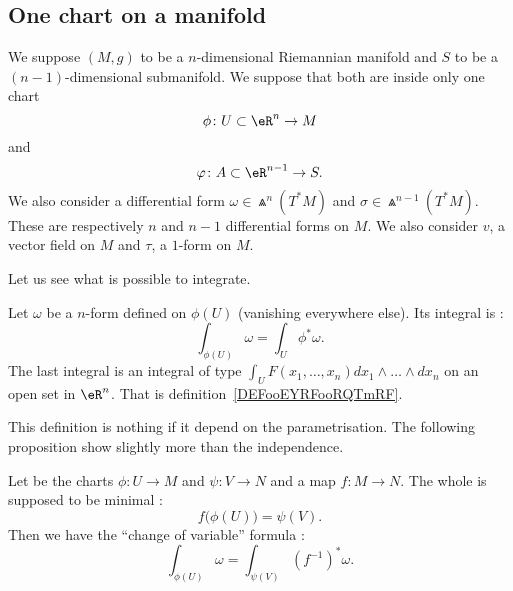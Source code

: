 \subsection{One chart on a manifold}

We suppose \( (M,g)\) to be a \( n\)-dimensional Riemannian manifold and \( S\) to be a \( (n-1)\)-dimensional submanifold. We suppose that both are inside only one chart
\begin{equation}
    \phi\colon U\subset \eR^n\to M
\end{equation}
and
\begin{equation}
    \varphi\colon A\subset \eR^{n-1}\to S.
\end{equation}
We also consider a differential form \( \omega\in \Wedge^n(T^*M)\) and \( \sigma\in\Wedge^{n-1}(T^*M)\). These are respectively \( n\) and \( n-1\) differential forms on \( M\).  We also consider \( v\), a vector field on \( M\) and \( \tau\), a \( 1\)-form on \(M\).

Let us see what is possible to integrate.

\begin{definition}       \label{DEFooPDRCooPiBklC}
    Let \( \omega\) be a \( n\)-form defined on \( \phi(U)\) (vanishing everywhere else). Its integral is :
    \begin{equation}
        \int_{\phi(U)}\omega=\int_U\phi^*\omega.
    \end{equation}
    The last integral is an integral of type \( \int_{U}F(x_1,\ldots, x_n)dx_1\wedge\ldots \wedge dx_n\) on an open set in \( \eR^n\). That is definition~\ref{DEFooEYRFooRQTmRF}.
\end{definition}

This definition is nothing if it depend on the parametrisation. The following proposition show slightly more than the independence.
\begin{proposition}       \label{PROPooNJCLooMqeeeX}
    Let be the charts \( \phi\colon U\to M\) and \( \psi\colon V\to N\) and a map \( f\colon M\to N\). The whole is supposed to be minimal :
    \begin{equation}
        f\big( \phi(U) \big)=\psi(V).
    \end{equation}
    Then we have the ``change of variable'' formula :
    \begin{equation}
        \int_{\phi(U)}\omega=\int_{\psi(V)}(f^{-1})^*\omega.
    \end{equation}
\end{proposition}

